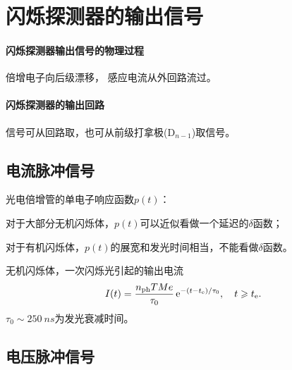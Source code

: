 \section{闪烁探测器的输出信号}

\paragraph{闪烁探测器输出信号的物理过程}
倍增电子向后级漂移，
感应电流从外回路流过。
\paragraph{闪烁探测器的输出回路}
信号可从回路取，也可从前级打拿极(D$_{n-1}$)取信号。

\subsection{电流脉冲信号}

光电倍增管的单电子响应函数$p(t)$：
\begin{compactitem}
	\item 对于大部分无机闪烁体，$p(t)$可以近似看做一个延迟的$\delta$函数；
	\item 对于有机闪烁体，$p(t)$的展宽和发光时间相当，不能看做$\delta$函数。
\end{compactitem}
无机闪烁体，一次闪烁光引起的输出电流
\[
	I(t)=\frac{n_{\mathrm{ph}}TMe}{\tau_0}\mathop{}\!\mathrm{e}^{-(t-t_\mathrm e)/\tau_0},\quad t\geqslant t_\mathrm e.
\]
$\tau_0\sim\SI{250}{ns}$为发光衰减时间。

\subsection{电压脉冲信号}


